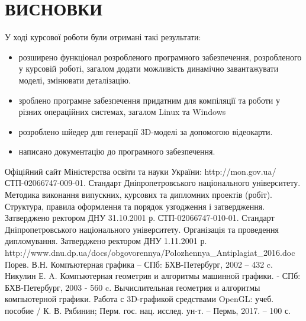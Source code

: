 \let\mypdfximage\pdfximage\def\pdfximage{\immediate\mypdfximage}\documentclass[14pt,a4paper]{extarticle}
\theoremstyle{definition}
\renewcommand{\[}{\begin{singlespace}\begin{equation*}}
\renewcommand{\]}{\end{equation*}\end{singlespace}}
\newcounter{rtaskno}
\newcommand{\rtask}[1]{\refstepcounter{rtaskno}\label{#1}}
\renewcommand{\+}{\discretionary{\mbox{\scriptsize$\hookleftarrow$}}{}{}}
\begin{document}









\section*{ВИСНОВКИ}
У ході курсової роботи були отримані такі результати:

\begin{itemize}
\item розширено функціонал розробленого програмного забезпечення, розробленого у курсовій роботі, загалом додати можливість динамічно завантажувати моделі, змінювати деталізацію.
\item зроблено програмне забезпечення придатним для компіляції та роботи у різних операційних системах, загалом Linux та Windows
\item розроблено шйедер для генерації 3D-моделі за допомогою відеокарти.
\item написано документацію до програмного забезпечення.
\end{itemize}

\begin{thebibliography}{9}
\bibitem{} Офіційний сайт Міністерства освіти та науки України: http://mon.gov.ua/
\bibitem{} СТП-02066747-009-01. Стандарт Дніпропетровського національного університету. Методика виконання випускних, курсових та дипломних проектів (робіт). Структура, правила оформлення та порядок узгодження і затвердження. Затверджено ректором ДНУ 31.10.2001 р.
\bibitem{} СТП-02066747-010-01. Стандарт Дніпропетровського національного університету. Організація та проведення дипломування. Затверджено ректором ДНУ 1.11.2001 р.
\bibitem{} http://www.dnu.dp.ua/docs/obgovorennya/Polozhennya\_Antiplagiat\_2016.doc
 Порев. В.Н. Компъютерная графика -- СПб: БХВ-Петербург, 2002 -- 432 c.
 Никулин Е. A. Компъютерная геометрия и алгоритмы машинной графики. - СПб: БХВ-Петербург, 2003 - 560 c.
 Вычислительная геометрия и алгоритмы компьютерной графики. Работа с 3D-графикой средствами OpenGL: учеб. пособие / К. В. Рябинин; Перм. гос. нац. исслед. ун-т. – Пермь, 2017. – 100 с.
\end{thebibliography}

\rtask{lastpage}
\end{document}
